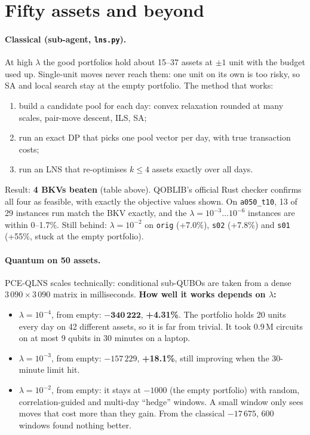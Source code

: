 \documentclass[11pt]{article}
\newcommand{\gapgood}[1]{\textcolor{good}{\textbf{#1}}}
\newcommand{\gapmid}[1]{\textcolor{mid}{\textbf{#1}}}
\begin{document}
\section{Fifty assets and beyond}\label{sec:a050}
\paragraph{Classical (sub-agent, \texttt{lns.py}).} At high $\lambda$ the good portfolios hold about
15--37 assets at $\pm1$ unit with the budget used up. Single-unit moves never reach them: one unit on
its own is too risky, so SA and local search stay at the empty portfolio. The method that works:
\begin{enumerate}
\item build a candidate pool for each day: convex relaxation rounded at many scales, pair-move descent, ILS, SA;
\item run an exact DP that picks one pool vector per day, with true transaction costs;
\item run an LNS that re-optimises $k\le4$ assets exactly over all days.
\end{enumerate}
Result: \textbf{4 BKVs beaten} (table above). QOBLIB's official Rust checker confirms all four
as feasible, with exactly the objective values shown. On \texttt{a050\_t10}, 13 of 29 instances run match the
BKV exactly, and the $\lambda=10^{-3}\ldots10^{-6}$ instances are within 0--1.7\%. Still behind:
$\lambda=10^{-2}$ on \texttt{orig} (+7.0\%), \texttt{s02} (+7.8\%) and \texttt{s01} (+55\%, stuck at the empty portfolio).

\paragraph{Quantum on 50 assets.} PCE-QLNS scales technically: conditional sub-QUBOs are taken from a dense
$3\,090\times3\,090$ matrix in milliseconds. \textbf{How well it works depends on $\lambda$:}
\begin{itemize}
\item $\lambda=10^{-4}$, from empty: $\mathbf{-340\,222}$, \gapgood{+4.31\%}. The portfolio holds 20 units
  every day on 42 different assets, so it is far from trivial. It took 0.9\,M circuits on at most 9 qubits
  in 30 minutes on a laptop.
\item $\lambda=10^{-3}$, from empty: $-157\,229$, \gapmid{+18.1\%}, still improving when the 30-minute
  limit hit.
\item $\lambda=10^{-2}$, from empty: it stays at $-1000$ (the empty portfolio) with random,
  correlation-guided and multi-day ``hedge'' windows. A small window only sees moves that cost more than
  they gain. From the classical $-17\,675$, 600 windows found nothing better.
\end{itemize}
\end{document}
